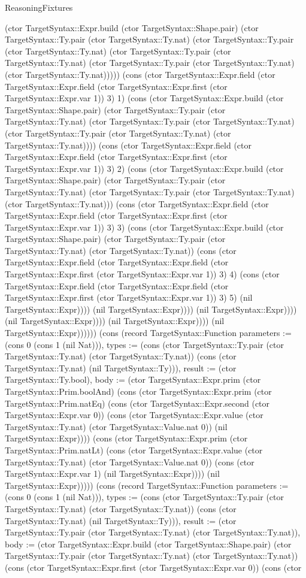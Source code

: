 \begin{lexlean}{ReasoningFixtures}
\begin{semanticmodule}
{(ctor TargetSyntax::Expr.build (ctor TargetSyntax::Shape.pair) (ctor TargetSyntax::Ty.pair (ctor TargetSyntax::Ty.nat) (ctor TargetSyntax::Ty.pair (ctor TargetSyntax::Ty.nat) (ctor TargetSyntax::Ty.pair (ctor TargetSyntax::Ty.nat) (ctor TargetSyntax::Ty.pair (ctor TargetSyntax::Ty.nat) (ctor TargetSyntax::Ty.nat))))) (cons (ctor TargetSyntax::Expr.field (ctor TargetSyntax::Expr.field (ctor TargetSyntax::Expr.first (ctor TargetSyntax::Expr.var 1)) 3) 1) (cons (ctor TargetSyntax::Expr.build (ctor TargetSyntax::Shape.pair) (ctor TargetSyntax::Ty.pair (ctor TargetSyntax::Ty.nat) (ctor TargetSyntax::Ty.pair (ctor TargetSyntax::Ty.nat) (ctor TargetSyntax::Ty.pair (ctor TargetSyntax::Ty.nat) (ctor TargetSyntax::Ty.nat)))) (cons (ctor TargetSyntax::Expr.field (ctor TargetSyntax::Expr.field (ctor TargetSyntax::Expr.first (ctor TargetSyntax::Expr.var 1)) 3) 2) (cons (ctor TargetSyntax::Expr.build (ctor TargetSyntax::Shape.pair) (ctor TargetSyntax::Ty.pair (ctor TargetSyntax::Ty.nat) (ctor TargetSyntax::Ty.pair (ctor TargetSyntax::Ty.nat) (ctor TargetSyntax::Ty.nat))) (cons (ctor TargetSyntax::Expr.field (ctor TargetSyntax::Expr.field (ctor TargetSyntax::Expr.first (ctor TargetSyntax::Expr.var 1)) 3) 3) (cons (ctor TargetSyntax::Expr.build (ctor TargetSyntax::Shape.pair) (ctor TargetSyntax::Ty.pair (ctor TargetSyntax::Ty.nat) (ctor TargetSyntax::Ty.nat)) (cons (ctor TargetSyntax::Expr.field (ctor TargetSyntax::Expr.field (ctor TargetSyntax::Expr.first (ctor TargetSyntax::Expr.var 1)) 3) 4) (cons (ctor TargetSyntax::Expr.field (ctor TargetSyntax::Expr.field (ctor TargetSyntax::Expr.first (ctor TargetSyntax::Expr.var 1)) 3) 5) (nil TargetSyntax::Expr)))) (nil TargetSyntax::Expr)))) (nil TargetSyntax::Expr)))) (nil TargetSyntax::Expr)))) (nil TargetSyntax::Expr)))) (nil TargetSyntax::Expr)))))}) (cons (record TargetSyntax::Function {parameters := (cons 0 (cons 1 (nil Nat))), types := (cons (ctor TargetSyntax::Ty.pair (ctor TargetSyntax::Ty.nat) (ctor TargetSyntax::Ty.nat)) (cons (ctor TargetSyntax::Ty.nat) (nil TargetSyntax::Ty))), result := (ctor TargetSyntax::Ty.bool), body := (ctor TargetSyntax::Expr.prim (ctor TargetSyntax::Prim.boolAnd) (cons (ctor TargetSyntax::Expr.prim (ctor TargetSyntax::Prim.natEq) (cons (ctor TargetSyntax::Expr.second (ctor TargetSyntax::Expr.var 0)) (cons (ctor TargetSyntax::Expr.value (ctor TargetSyntax::Ty.nat) (ctor TargetSyntax::Value.nat 0)) (nil TargetSyntax::Expr)))) (cons (ctor TargetSyntax::Expr.prim (ctor TargetSyntax::Prim.natLt) (cons (ctor TargetSyntax::Expr.value (ctor TargetSyntax::Ty.nat) (ctor TargetSyntax::Value.nat 0)) (cons (ctor TargetSyntax::Expr.var 1) (nil TargetSyntax::Expr)))) (nil TargetSyntax::Expr))))}) (cons (record TargetSyntax::Function {parameters := (cons 0 (cons 1 (nil Nat))), types := (cons (ctor TargetSyntax::Ty.pair (ctor TargetSyntax::Ty.nat) (ctor TargetSyntax::Ty.nat)) (cons (ctor TargetSyntax::Ty.nat) (nil TargetSyntax::Ty))), result := (ctor TargetSyntax::Ty.pair (ctor TargetSyntax::Ty.nat) (ctor TargetSyntax::Ty.nat)), body := (ctor TargetSyntax::Expr.build (ctor TargetSyntax::Shape.pair) (ctor TargetSyntax::Ty.pair (ctor TargetSyntax::Ty.nat) (ctor TargetSyntax::Ty.nat)) (cons (ctor TargetSyntax::Expr.first (ctor TargetSyntax::Expr.var 0)) (cons (ctor }
\end{semanticmodule}
\end{lexlean}
